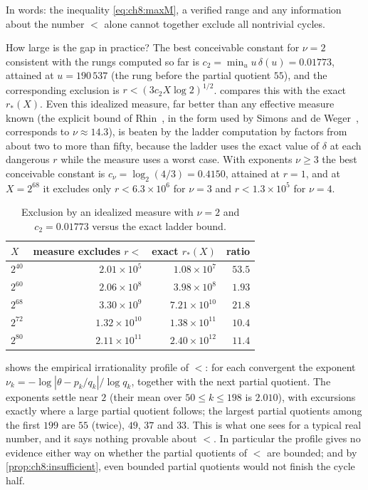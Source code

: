 In words: the inequality \eqref{eq:ch8:maxM}, a verified range and any information about the number $\lt$ alone cannot together exclude all nontrivial cycles.

How large is the gap in practice? The best conceivable constant for $\nu=2$
consistent with the rungs computed so far is $c_2=\min_u u\,\delta(u)
=0.01773$, attained at $u=190\,537$ (the rung before the partial quotient
$55$), and the corresponding exclusion is $r<(3c_2X\log2)^{1/2}$.
 compares this with the exact $r_*(X)$. Even this
idealized measure, far better than any effective measure known (the explicit bound of Rhin~\cite{rhin1987}, in the form used by Simons and de Weger~\cite[Lemma~12]{simons2005}, corresponds to $\nu\approx14.3$), is beaten by
the ladder computation by factors from about two to more than fifty, because the ladder
uses the exact value of $\delta$ at each dangerous $r$ while the measure uses
a worst case. With exponents $\nu\geq3$ the best conceivable constant is
$c_\nu=\log_2(4/3)=0.4150$, attained at $r=1$, and at $X=2^{68}$ it excludes
only $r<6.3\times10^6$ for $\nu=3$ and $r<1.3\times10^5$ for $\nu=4$.

\begin{table}[ht]
\centering\small
\caption{Exclusion by an idealized measure with $\nu=2$ and $c_2=0.01773$
versus the exact ladder bound.}
\label{tab:ch8:insufficient}
\begin{tabular}{@{}lrrr@{}}
\toprule
$X$ & measure excludes $r<$ & exact $r_*(X)$ & ratio \\
\midrule
$2^{40}$ & $2.01\times10^{5}$ & $1.08\times10^{7}$ & $53.5$ \\
$2^{60}$ & $2.06\times10^{8}$ & $3.98\times10^{8}$ & $1.93$ \\
$2^{68}$ & $3.30\times10^{9}$ & $7.21\times10^{10}$ & $21.8$ \\
$2^{72}$ & $1.32\times10^{10}$ & $1.38\times10^{11}$ & $10.4$ \\
$2^{80}$ & $2.11\times10^{11}$ & $2.40\times10^{12}$ & $11.4$ \\
\bottomrule
\end{tabular}
\end{table}

 shows the empirical irrationality profile of $\lt$:
for each convergent the exponent $\nu_k=-\log|\theta-p_k/q_k|/\log q_k$,
together with the next partial quotient. The exponents settle near $2$ (their
mean over $50\le k\le198$ is $2.010$), with excursions exactly where a large
partial quotient follows; the largest partial quotients among the first $199$
are $55$ (twice), $49$, $37$ and $33$. This is what one sees for a typical real
number, and it says nothing provable about $\lt$. In particular the profile
gives no evidence either way on whether the partial quotients of $\lt$ are
bounded; and by \cref{prop:ch8:insufficient}, even bounded partial quotients
would not finish the cycle half.


